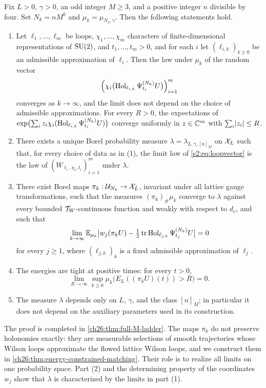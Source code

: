 \begin{theorem}\label{s2:thm:main}
Fix $L>0$, $\gamma>0$, an odd integer $M\ge3$, and a positive integer $n$ divisible by four. Set $N_k=nM^k$ and $\mu_k=\mu_{N_k,\gamma}$. Then the following statements hold.
\begin{enumerate}
\item Let $\ell_1,\dots,\ell_m$ be loops, $\chi_1,\dots,\chi_m$ characters of finite-dimensional representations of $\mathrm{SU}(2)$, and $t_1,\dots,t_m>0$, and for each $i$ let $(\ell_{i,k})_{k\ge0}$ be an admissible approximation of $\ell_i$. Then the law under $\mu_k$ of the random vector
\begin{equation}\label{s2:eq:loopvector}
 \Bigl(\chi_i\bigl(\operatorname{Hol}_{\ell_{i,k}}\Psi^{(N_k)}_{t_i}U\bigr)\Bigr)_{i=1}^m
\end{equation}
converges as $k\to\infty$, and the limit does not depend on the choice of admissible approximations. For every $R>0$, the expectations of $\exp\bigl(\sum_iz_i\chi_i(\operatorname{Hol}_{\ell_{i,k}}\Psi^{(N_k)}_{t_i}U)\bigr)$ converge uniformly in $z\in\mathbb C^m$ with $\sum_i\lvert z_i\rvert\le R$.
\item There exists a unique Borel probability measure $\lambda=\lambda_{L,\gamma,[n]_M}$ on $\mathcal X_L$ such that, for every choice of data as in (1), the limit law of \eqref{s2:eq:loopvector} is the law of $(W_{\ell_i,\chi_i,t_i})_{i=1}^m$ under $\lambda$.
\item There exist Borel maps $\pi_k:\mathcal U_{N_k}\to\mathcal X_L$, invariant under all lattice gauge transformations, such that the measures $(\pi_k)_\#\mu_k$ converge to $\lambda$ against every bounded $\mathcal T_W$-continuous function and weakly with respect to $d_c$, and such that
\[
 \lim_{k\to\infty}\mathbb E_{\mu_k}\bigl\lvert w_j(\pi_kU)-\tfrac12\operatorname{tr}\operatorname{Hol}_{\ell_{j,k}}\Psi^{(N_k)}_{t_j}U\bigr\rvert=0
\]
for every $j\ge1$, where $(\ell_{j,k})_k$ is a fixed admissible approximation of $\ell_j$.
\item The energies are tight at positive times: for every $t>0$,
\[
 \lim_{R\to\infty}\sup_{k\ge0}\mu_k\bigl(E_L((\pi_kU)(t))>R\bigr)=0.
\]
\item The measure $\lambda$ depends only on $L$, $\gamma$, and the class $[n]_M$; in particular it does not depend on the auxiliary parameters used in its construction.
\end{enumerate}
\end{theorem}

The proof is completed in \cref{ch26:thm:full-M-ladder}. The maps $\pi_k$ do not preserve holonomies exactly: they are measurable selections of smooth trajectories whose Wilson loops approximate the flowed lattice Wilson loops, and we construct them in \cref{ch26:thm:energy-constrained-matching}. Their role is to realize all limits on one probability space. Part (2) and the determining property of the coordinates $w_j$ show that $\lambda$ is characterized by the limits in part (1).


